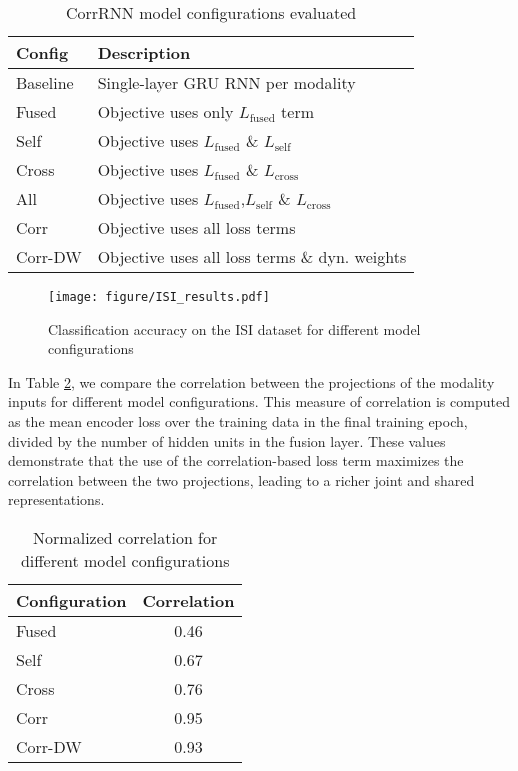 \documentclass[10pt,twocolumn,letterpaper]{article}
\begin{document}
\begin{table}[t!]
\begin{center}
\begin{tabular}{ | l | l |}
\hline
    Config & Description  \\
    \hline
    Baseline & Single-layer GRU RNN per modality \\
    \hline
    Fused & Objective uses only  $L_{\text{fused}}$ term\\
    \hline 
        Self & Objective uses  $L_{\text{fused}}$ \& $L_{\text{self}}$ \\
    \hline 
        Cross & Objective uses   $L_{\text{fused}}$ \& $L_{\text{cross}}$ \\
    \hline 
        All & Objective uses  $L_{\text{fused}}$,$L_{\text{self}}$ \& $L_{\text{cross}}$ \\
    \hline 
        Corr & Objective uses all loss terms \\
    \hline 
        Corr-DW &  Objective uses all loss terms \& dyn. weights \\
    \hline 
\end{tabular}
\end{center}
\caption{CorrRNN model configurations evaluated}
\label{tab:config}
\end{table}

\begin{figure}
\texttt{[image: figure/ISI\_results.pdf]}
\caption{Classification accuracy on the ISI dataset for different model configurations}
\label{fig:ISI}
\end{figure}

In Table \ref{tab:corr}, we compare the correlation between the projections of the modality inputs for different model configurations. This measure of correlation is computed as the mean encoder loss over the training data in the final training epoch, divided by the number of hidden units in the fusion layer. These values demonstrate that the use of the correlation-based loss term maximizes the correlation between the two projections, leading to a richer joint and shared representations. 
\begin{table}
\begin{center}
\begin{tabular}{|l|c|}
	\hline
    Configuration & Correlation \\ 
    \hline
    Fused & 0.46 \\
    Self &  0.67\\
    Cross &  0.76\\
    \hline
    Corr &  0.95\\
    Corr-DW & 0.93 \\
    \hline
\end{tabular}
\end{center}
\caption{Normalized correlation for different model configurations}
\label{tab:corr}
\end{table}
\end{document}
